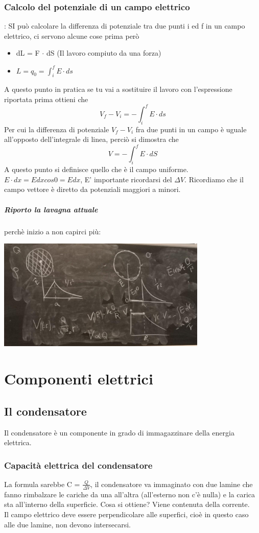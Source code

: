 \documentclass[12pt, a4paper, openany, oneside]{book}
\begin{document}
\subsection{Calcolo del potenziale di un campo elettrico}: SI può calcolare
la differenza di potenziale tra due punti i ed f in un campo elettrico, ci servono
alcune cose prima però
\begin{itemize}
	\item dL = F $\cdot$ dS (Il lavoro compiuto da una forza)
	\item $L = q_{0} = \int_{i}^{f} E \cdot ds$
\end{itemize}
A questo punto in pratica se tu vai a sostituire il lavoro con l'espressione
riportata prima ottieni che 
\[
    	V_{f} - V_{i} = - \int_{i}^{f} E \cdot ds
\]    
Per cui la differenza di potenziale $V_{f} - V_{i}$ fra due punti in un campo è
uguale all'opposto dell'integrale di linea, perciò si dimostra che
\[
  	V = - \int_{i}^{f} E \cdot dS
  \]	  
A questo punto si definisce quello che è il campo uniforme. $E \cdot dx = E dx cos 0 = E dx$,
E' importante ricordarsi del $\Delta V$. Ricordiamo che il campo vettore è 
diretto da potenziali maggiori a minori. 
\paragraph{Riporto la lavagna attuale} perchè inizio a non capirci più:
\begin{center}
\includegraphics[width=0.75\textwidth]{22}
\end{center}
\chapter{Componenti elettrici}
\section{Il condensatore}
Il condensatore è un componente in grado di immagazzinare della energia elettrica.
\subsection{Capacità elettrica del condensatore}
La formula sarebbe C = $\frac{Q}{\Delta V}$, il condensatore va immaginato con 
due lamine che fanno rimbalzare le cariche da una all'altra (all'esterno non c'è
nulla) e la carica sta all'interno della superficie. Cosa si ottiene? Viene 
contenuta della corrente. \\
Il campo elettrico deve essere perpendicolare alle superfici, cioè in questo caso
alle due lamine, non devono intersecarsi.
\end{document}

